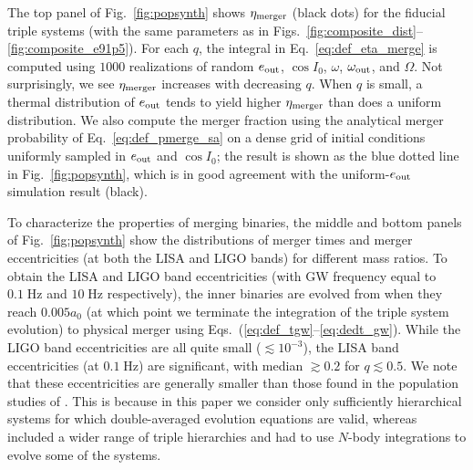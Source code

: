 \documentclass[
        fleqn,
        usenatbib,
    ]{mnras}
\begin{document}
The top panel of Fig.~\ref{fig:popsynth} shows $\eta_{\rm merger}$ (black
dots) for the fiducial triple systems (with the same parameters as in
Figs.~\ref{fig:composite_dist}--\ref{fig:composite_e91p5}). For each $q$, the
integral in Eq.~\eqref{eq:def_eta_merge} is computed using $1000$ realizations
of random $e_{\rm out}$, $\cos I_0$, $\omega$, $\omega_{\rm out}$, and
$\Omega$. Not surprisingly, we see $\eta_{\rm merger}$ increases with decreasing
$q$. When $q$ is small, a thermal distribution of $e_{\rm out}$ tends to yield
higher $\eta_{\rm merger}$ than does a uniform distribution. We also compute the
merger fraction using the analytical merger probability of
Eq.~\eqref{eq:def_pmerge_sa} on a dense grid of initial conditions uniformly
sampled in $e_{\rm out}$ and $\cos I_0$; the result is shown as the blue dotted
line in Fig.~\ref{fig:popsynth}, which is in good agreement with the
uniform-$e_{\rm out}$ simulation result (black).

To characterize the properties of merging binaries, the middle and bottom panels
of Fig.~\ref{fig:popsynth} show the distributions of merger times and merger
eccentricities (at both the LISA and LIGO bands) for different mass ratios. To
obtain the LISA and LIGO band eccentricities (with GW frequency equal to
$0.1\;\mathrm{Hz}$ and $10\;\mathrm{Hz}$ respectively), the inner binaries are
evolved from when they reach $0.005 a_0$ (at which point we terminate the
integration of the triple system evolution) to physical merger using
Eqs.~(\ref{eq:def_tgw}--\ref{eq:dedt_gw}). While the LIGO band eccentricities
are all quite small ($\lesssim 10^{-3}$), the LISA band eccentricities (at $0.1
\;\mathrm{Hz}$) are significant, with median $\gtrsim 0.2$ for $q\lesssim 0.5$.
We note that these eccentricities are generally smaller than those found in the
population studies of \citet{LL19}. This is because in this paper we consider
only sufficiently hierarchical systems for which double-averaged evolution
equations are valid, whereas \citet{LL19} included a wider range of triple
hierarchies and had to use $N$-body integrations to evolve some of the systems.
\end{document}
